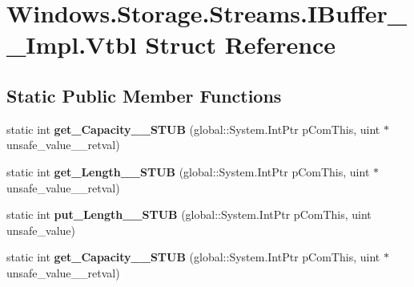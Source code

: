 \hypertarget{struct_windows_1_1_storage_1_1_streams_1_1_i_buffer_____impl_1_1_vtbl}{}\section{Windows.\+Storage.\+Streams.\+I\+Buffer\+\_\+\+\_\+\+Impl.\+Vtbl Struct Reference}
\label{struct_windows_1_1_storage_1_1_streams_1_1_i_buffer_____impl_1_1_vtbl}
\subsection*{Static Public Member Functions}
\begin{DoxyCompactItemize}
\item 
\mbox{\label{struct_windows_1_1_storage_1_1_streams_1_1_i_buffer_____impl_1_1_vtbl_a0edf8e49726df558522286d08c40d999}} 
static int {\bfseries get\+\_\+\+Capacity\+\_\+\+\_\+\+S\+T\+UB} (global\+::\+System.\+Int\+Ptr p\+Com\+This, uint $\ast$unsafe\+\_\+value\+\_\+\+\_\+retval)
\item 
\mbox{\label{struct_windows_1_1_storage_1_1_streams_1_1_i_buffer_____impl_1_1_vtbl_abddf84bc05273d8c2287462bf3ba0ed9}} 
static int {\bfseries get\+\_\+\+Length\+\_\+\+\_\+\+S\+T\+UB} (global\+::\+System.\+Int\+Ptr p\+Com\+This, uint $\ast$unsafe\+\_\+value\+\_\+\+\_\+retval)
\item 
\mbox{\label{struct_windows_1_1_storage_1_1_streams_1_1_i_buffer_____impl_1_1_vtbl_a80544026998fc1559ccd7885d251ce1b}} 
static int {\bfseries put\+\_\+\+Length\+\_\+\+\_\+\+S\+T\+UB} (global\+::\+System.\+Int\+Ptr p\+Com\+This, uint unsafe\+\_\+value)
\item 
\mbox{\label{struct_windows_1_1_storage_1_1_streams_1_1_i_buffer_____impl_1_1_vtbl_a0edf8e49726df558522286d08c40d999}} 
static int {\bfseries get\+\_\+\+Capacity\+\_\+\+\_\+\+S\+T\+UB} (global\+::\+System.\+Int\+Ptr p\+Com\+This, uint $\ast$unsafe\+\_\+value\+\_\+\+\_\+retval)
\item 

\end{DoxyCompactItemize}
